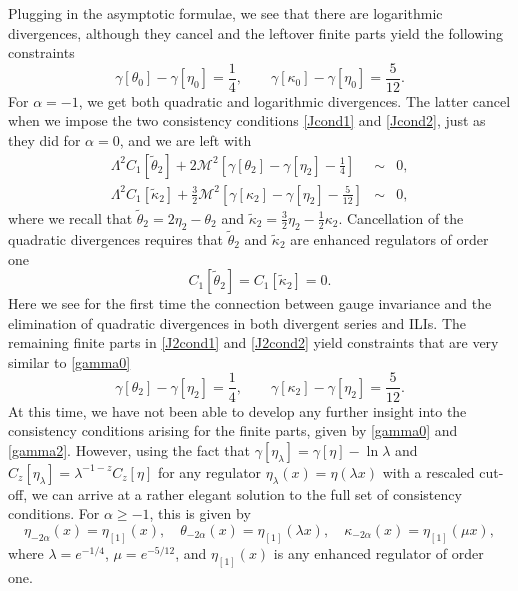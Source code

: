 \documentclass[11pt, letter]{article}
\def\be{\begin{equation}}
\def\ee{\end{equation}}
\newcommand{\M}{\mathcal{M}}
\begin{document}
Plugging in the asymptotic formulae, we see that  there are logarithmic divergences, although they cancel and the leftover finite parts yield the following constraints
\be \label{gamma0}
\gamma[\theta_0]-\gamma[\eta_0]=\frac14, \qquad \gamma[\kappa_0]-\gamma[\eta_0]=\frac{5}{12}.
\ee
For $\alpha=-1$, we get both quadratic and logarithmic divergences.  The latter cancel when  we impose the  two consistency conditions \eqref{Jcond1} and \eqref{Jcond2}, just as they did for $\alpha=0$, and we are left with
\begin{eqnarray}
\Lambda^2 C_1[\tilde \theta_{2}]+2\M^2\left[\gamma[\theta_2]-\gamma[\eta_2]-\frac14\right] &\sim& 0, \label{J2cond1} \\
\Lambda^2 C_1[\tilde \kappa_2]+\frac{3}{2} \M^2\left[\gamma[\kappa_2]-\gamma[\eta_2]-\frac{5}{12}\right]  &\sim & 0, \label{J2cond2}
\end{eqnarray}
where we recall that $\tilde \theta_{2}=2\eta_2-\theta_2$ and $\tilde \kappa_2=\frac32 \eta_2-\frac12 \kappa_2$.  Cancellation of the quadratic divergences requires that $\tilde \theta_2$ and $\tilde \kappa_2$ are enhanced regulators of order one
\be \label{C1eqn}
C_1[\tilde \theta_{2}]=C_1[\tilde \kappa_2]=0.
\ee
Here we see for the first time the connection between gauge invariance and the elimination of quadratic divergences in both divergent series and ILIs. The remaining finite parts in \eqref{J2cond1} and \eqref{J2cond2} yield constraints that are very similar to \eqref{gamma0}
\be \label{gamma2}
\gamma[\theta_2]-\gamma[\eta_2]=\frac14, \qquad \gamma[\kappa_2]-\gamma[\eta_2]=\frac{5}{12}.
\ee
At this time, we have not been able to develop any further insight into the consistency conditions arising for the finite parts, given by \eqref{gamma0} and \eqref{gamma2}. However, using the fact that $\gamma[\eta_\lambda]=\gamma[\eta]-\ln \lambda$ and $C_z[\eta_\lambda]=\lambda^{-1-z} C_z[\eta]$ for any regulator $\eta_\lambda(x)=\eta(\lambda x)$ with a rescaled cut-off, we can arrive at a rather elegant solution to the full set of consistency conditions. For $\alpha \geq -1$, this is given by
\be
\eta_{-2\alpha}(x)=\eta_{[1]}(x), \quad \theta_{-2\alpha}(x)=\eta_{[1]}(\lambda x), \quad \kappa_{-2\alpha}(x)=\eta_{[1]}(\mu x),
\ee
where $\lambda=e^{-1/4}$, $\mu=e^{-5/12}$, and $\eta_{[1]}(x)$ is any enhanced regulator of order one. 
\end{document}
